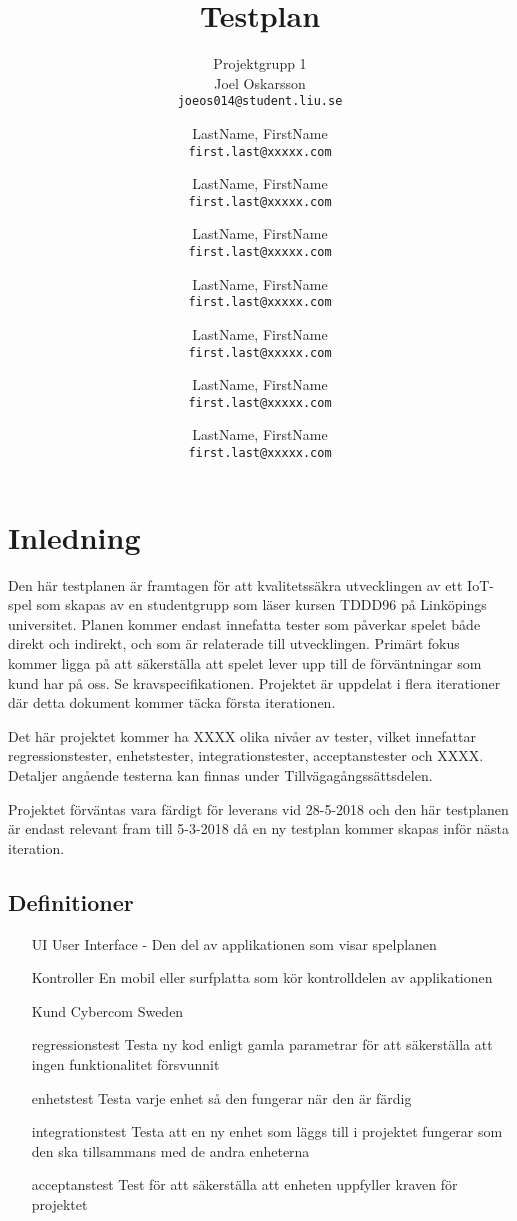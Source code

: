 \documentclass[10pt]{article}
\title{Testplan}
\author{
	Projektgrupp 1\\
	Joel Oskarsson\\
	\texttt{joeos014@student.liu.se}
	\and
	LastName, FirstName\\
	\texttt{first.last@xxxxx.com}
	\and
	LastName, FirstName\\
	\texttt{first.last@xxxxx.com}
	\and
	LastName, FirstName\\
	\texttt{first.last@xxxxx.com}
	\and
	LastName, FirstName\\
	\texttt{first.last@xxxxx.com}
  	\and
  	LastName, FirstName\\
  	\texttt{first.last@xxxxx.com}
  	\and
  	LastName, FirstName\\
  	\texttt{first.last@xxxxx.com}
  	\and
  	LastName, FirstName\\
  	\texttt{first.last@xxxxx.com}
}
\begin{document}
\maketitle
\pagebreak
\tableofcontents
\pagebreak
\section{Inledning}
	Den här testplanen är framtagen för att kvalitetssäkra utvecklingen av ett IoT-spel som skapas av en studentgrupp som läser kursen TDDD96 på Linköpings universitet. Planen kommer endast innefatta tester som påverkar spelet både direkt och indirekt, och som är relaterade till utvecklingen. Primärt fokus kommer ligga på att säkerställa att spelet lever upp till de förväntningar som kund har på oss. Se kravspecifikationen. Projektet är uppdelat i flera iterationer där detta dokument kommer täcka första iterationen.

Det här projektet kommer ha {\color{red}XXXX} olika nivåer av tester, vilket innefattar regressionstester, enhetstester, integrationstester, acceptanstester och {\color{red}XXXX}. Detaljer angående testerna kan finnas under Tillvägagångssättsdelen.

Projektet förväntas vara färdigt för leverans vid {\color{red}28-5-2018} och den här testplanen är endast relevant fram till {\color{red}5-3-2018} då en ny testplan kommer skapas inför nästa iteration.



	\subsection{Definitioner}
		\begin{itemize}
		\item [UI] User Interface - Den del av applikationen som visar spelplanen
		\item [Kontroller] En mobil eller surfplatta som kör kontrolldelen av applikationen
		\item [Kund] Cybercom Sweden
		\item [regressionstest] Testa ny kod enligt gamla parametrar för att säkerställa att ingen funktionalitet försvunnit
		\item [enhetstest] Testa varje enhet så den fungerar när den är färdig
		\item [integrationstest] Testa att en ny enhet som läggs till i projektet fungerar som den ska tillsammans med de andra enheterna
		\item [acceptanstest] Test för att säkerställa att enheten uppfyller kraven för projektet
		\end{itemize}	
\end{document}
